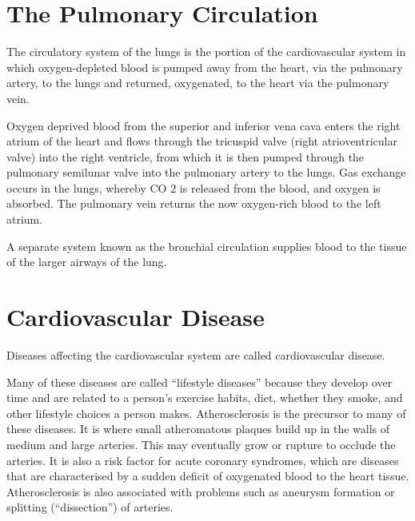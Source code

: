 \hypertarget{the-pulmonary-circulation}{%
\section{The Pulmonary Circulation}\label{the-pulmonary-circulation}}

The circulatory system of the lungs is the portion of the cardiovascular system in which oxygen-depleted blood is pumped away from the heart, via the pulmonary artery, to the lungs and returned, oxygenated, to the heart via the pulmonary vein.

Oxygen deprived blood from the superior and inferior vena cava enters the right atrium of the heart and flows through the tricuspid valve (right atrioventricular valve) into the right ventricle, from which it is then pumped through the pulmonary semilunar valve into the pulmonary artery to the lungs. Gas exchange occurs in the lungs, whereby CO
2 is released from the blood, and oxygen is absorbed. The pulmonary vein returns the now oxygen-rich blood to the left atrium.

A separate system known as the bronchial circulation supplies blood to the tissue of the larger airways of the lung.

\hypertarget{cardiovascular-disease}{%
\section{Cardiovascular Disease}\label{cardiovascular-disease}}

Diseases affecting the cardiovascular system are called cardiovascular disease.

Many of these diseases are called ``lifestyle diseases'' because they develop over time and are related to a person's exercise habits, diet, whether they smoke, and other lifestyle choices a person makes. Atherosclerosis is the precursor to many of these diseases. It is where small atheromatous plaques build up in the walls of medium and large arteries. This may eventually grow or rupture to occlude the arteries. It is also a risk factor for acute coronary syndromes, which are diseases that are characterised by a sudden deficit of oxygenated blood to the heart tissue. Atherosclerosis is also associated with problems such as aneurysm formation or splitting (``dissection'') of arteries.



